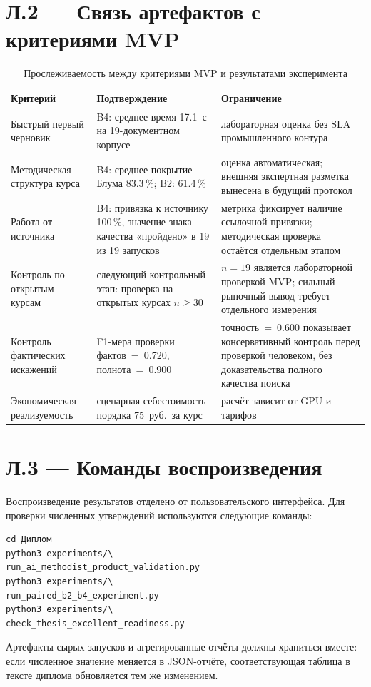 \section*{Л.2 — Связь артефактов с критериями MVP}

\begin{table}[htbp]
  \caption{Прослеживаемость между критериями MVP и результатами эксперимента}
  \label{tab:appendix-mvp-traceability}
  \centering
  \begin{tabular}{|P{4.0cm}|P{4.8cm}|P{4.7cm}|}
  \hline
  \textbf{Критерий} & \textbf{Подтверждение} & \textbf{Ограничение} \\
  \hline
  Быстрый первый черновик & B4: среднее время 17.1~с на 19-документном корпусе
  & лабораторная оценка без SLA промышленного контура \\
  \hline
  Методическая структура курса & B4: среднее покрытие Блума 83.3\,\%;
  B2: 61.4\,\%
  & оценка автоматическая; внешняя экспертная разметка вынесена в будущий протокол \\
  \hline
  Работа от источника & B4: привязка к источнику 100\,\%, значение
  знака качества «пройдено» в 19 из 19 запусков
  & метрика фиксирует наличие ссылочной привязки; методическая проверка остаётся отдельным этапом \\
  \hline
  Контроль по открытым курсам & следующий контрольный этап:
  проверка на открытых курсах $n \geq 30$
  & $n=19$ является лабораторной проверкой MVP; сильный рыночный вывод
  требует отдельного измерения \\
  \hline
  Контроль фактических искажений & F1-мера проверки фактов~=~0.720,
  полнота~=~0.900
  & точность~=~0.600 показывает консервативный контроль перед проверкой человеком,
  без доказательства полного качества поиска \\
  \hline
  Экономическая реализуемость & сценарная себестоимость порядка
  75~руб.\ за курс
  & расчёт зависит от GPU и тарифов \\
  \hline
  \end{tabular}
\end{table}

\section*{Л.3 — Команды воспроизведения}

Воспроизведение результатов отделено от пользовательского интерфейса.
Для проверки численных утверждений используются следующие команды:

\begin{verbatim}
cd Диплом
python3 experiments/\
run_ai_methodist_product_validation.py
python3 experiments/\
run_paired_b2_b4_experiment.py
python3 experiments/\
check_thesis_excellent_readiness.py
\end{verbatim}

Артефакты сырых запусков и агрегированные отчёты должны храниться вместе:
если численное значение меняется в JSON-отчёте, соответствующая таблица
в тексте диплома обновляется тем же изменением.
